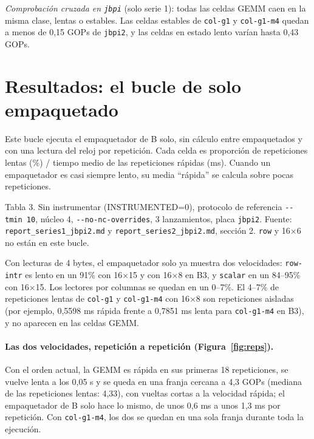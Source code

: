 \emph{Comprobación cruzada en \texttt{jbpi}} (solo serie 1): todas las celdas GEMM caen en la misma clase, lentas o estables. Las
celdas estables de \texttt{col-g1} y \texttt{col-g1-m4} quedan a menos de 0,15 GOPs de \texttt{jbpi2}, y las celdas en estado lento
varían hasta 0,43 GOPs.

\clearpage
\section{Resultados: el bucle de solo empaquetado}
\label{sec:packonly}
Este bucle ejecuta el empaquetador de B solo, sin cálculo entre empaquetados y con una lectura del reloj por repetición. Cada celda es
proporción de repeticiones lentas (\%) / tiempo medio de las repeticiones rápidas (ms). Cuando un empaquetador es casi siempre lento,
su media ``rápida'' se calcula sobre pocas repeticiones.

\begin{center}\footnotesize\setlength{\tabcolsep}{4pt}
\end{center}
{\footnotesize Tabla 3. Sin instrumentar (INSTRUMENTED=0), protocolo de referencia \texttt{-{}-tmin 10}, núcleo 4,
\texttt{-{}-no-nc-overrides}, 3 lanzamientos, placa \texttt{jbpi2}. Fuente: \texttt{report\_series1\_jbpi2.md} y
\texttt{report\_series2\_jbpi2.md}, sección 2. \texttt{row} y 16$\times$6 no están en este bucle.}

Con lecturas de 4 bytes, el empaquetador solo ya muestra dos velocidades: \texttt{row-intr} es lento en un 91\% con 16$\times$15 y con
16$\times$8 en B3, y \texttt{scalar} en un 84--95\% con 16$\times$15. Los lectores por columnas se quedan en un 0--7\%. El 4--7\% de
repeticiones lentas de \texttt{col-g1} y \texttt{col-g1-m4} con 16$\times$8 son repeticiones aisladas (por ejemplo, 0,5598 ms rápida
frente a 0,7851 ms lenta para \texttt{col-g1-m4} en B3), y no aparecen en las celdas GEMM.

\paragraph{Las dos velocidades, repetición a repetición (Figura~\ref{fig:reps}).} Con el orden actual, la GEMM es rápida en sus
primeras 18 repeticiones, se vuelve lenta a los 0,05 s y se queda en una franja cercana a 4,3 GOPs (mediana de las repeticiones
lentas: 4,33), con vueltas cortas a la velocidad rápida; el empaquetador de B solo hace lo mismo, de unos 0,6 ms a unos 1,3 ms por
repetición. Con \texttt{col-g1-m4}, los dos se quedan en una sola franja durante toda la ejecución.

